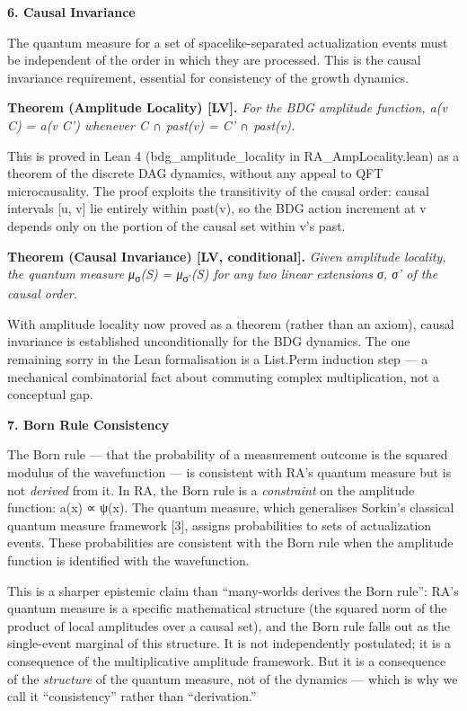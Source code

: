 \documentclass[12pt,a4paper]{article}
\begin{document}
\textbf{6. Causal Invariance}

The quantum measure for a set of spacelike-separated actualization
events must be independent of the order in which they are processed.
This is the causal invariance requirement, essential for consistency of
the growth dynamics.

\textbf{Theorem (Amplitude Locality) {[}LV{]}.} \emph{For the BDG
amplitude function, a(v \textbar{} C) = a(v \textbar{} C') whenever C ∩
past(v) = C' ∩ past(v).}

This is proved in Lean 4 (bdg\_amplitude\_locality in
RA\_AmpLocality.lean) as a theorem of the discrete DAG dynamics, without
any appeal to QFT microcausality. The proof exploits the transitivity of
the causal order: causal intervals {[}u, v{]} lie entirely within
past(v), so the BDG action increment at v depends only on the portion of
the causal set within v's past.

\textbf{Theorem (Causal Invariance) {[}LV, conditional{]}.} \emph{Given
amplitude locality, the quantum measure μ}\textsubscript{σ}\emph{(S) =
μ}\textsubscript{σ'}\emph{(S) for any two linear extensions σ, σ' of the
causal order.}

With amplitude locality now proved as a theorem (rather than an axiom),
causal invariance is established unconditionally for the BDG dynamics.
The one remaining sorry in the Lean formalisation is a List.Perm
induction step --- a mechanical combinatorial fact about commuting
complex multiplication, not a conceptual gap.

\textbf{7. Born Rule Consistency}

The Born rule --- that the probability of a measurement outcome is the
squared modulus of the wavefunction --- is consistent with RA's quantum
measure but is not \emph{derived} from it. In RA, the Born rule is a
\emph{constraint} on the amplitude function: a(x) ∝ ψ(x). The quantum
measure, which generalises Sorkin's classical quantum measure framework
{[}3{]}, assigns probabilities to sets of actualization events. These
probabilities are consistent with the Born rule when the amplitude
function is identified with the wavefunction.

This is a sharper epistemic claim than ``many-worlds derives the Born
rule'': RA's quantum measure is a specific mathematical structure (the
squared norm of the product of local amplitudes over a causal set), and
the Born rule falls out as the single-event marginal of this structure.
It is not independently postulated; it is a consequence of the
multiplicative amplitude framework. But it is a consequence of the
\emph{structure} of the quantum measure, not of the dynamics --- which
is why we call it ``consistency'' rather than ``derivation.''
\end{document}
